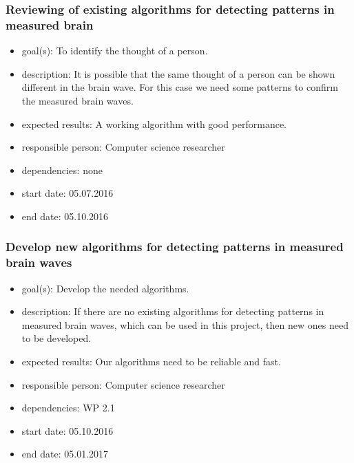 \subsubsection{Reviewing of existing algorithms for detecting patterns in measured brain}
\begin{itemize}
 \item goal(s): To identify the thought of a person.
 \item description: It is possible that the same thought of a person can be shown different in the brain wave. For this case we need some patterns to confirm the measured brain waves.
 \item expected results: A working algorithm with good performance.
 \item responsible person: Computer science researcher
 \item dependencies: none
 \item start date: 05.07.2016
 \item end date: 05.10.2016
\end{itemize}

\subsubsection{Develop new algorithms for detecting patterns in measured brain waves}
\begin{itemize}
 \item goal(s):  Develop the needed algorithms.
 \item description: If there are no existing algorithms for detecting patterns in measured brain waves, which can be used in this project, then new ones need to be developed.
 \item expected results: Our algorithms need to be reliable and fast.
 \item responsible person: Computer science researcher
 \item dependencies: WP 2.1 
 \item start date: 05.10.2016
 \item end date: 05.01.2017
\end{itemize}

